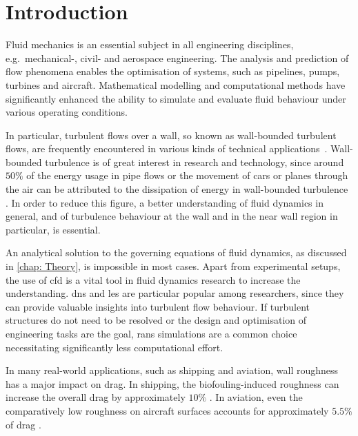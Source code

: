 \chapter{Introduction}\label{chap: Introduction}

Fluid mechanics is an essential subject in all engineering disciplines, e.g.\ mechanical-, civil- and aerospace engineering.
The analysis and prediction of flow phenomena enables the optimisation of systems, such as pipelines, pumps, turbines and aircraft.
Mathematical modelling and computational methods have significantly enhanced the ability to simulate and evaluate fluid behaviour under various operating conditions.

In particular, turbulent flows over a wall, so known as wall-bounded turbulent flows, are frequently encountered in various kinds of technical applications~\citep{marusicWallboundedTurbulentFlows2010,schlichtingBoundaryLayerTheory2017}.
Wall-bounded turbulence is of great interest in research and technology, since around $50 \%$ of the energy usage in pipe flows or the movement of cars or planes through the air can be attributed to the dissipation of energy in wall-bounded turbulence \citep{jimenezCascadesWallBoundedTurbulence2012}.
In order to reduce this figure, a better understanding of fluid dynamics in general, and of turbulence behaviour at the wall and in the near wall region in particular, is essential.

An analytical solution to the governing equations of fluid dynamics, as discussed in \autoref{chap: Theory}, is impossible in most cases.
Apart from experimental setups, the use of \acrfull{cfd} is a vital tool in fluid dynamics research to increase the understanding.
\acrfull{dns} and \acrfull{les} are particular popular among researchers, since they can provide valuable insights into turbulent flow behaviour\citep{moinDIRECTNUMERICALSIMULATION1998}.
If turbulent structures do not need to be resolved or the design and optimisation of engineering tasks are the goal, \acrfull{rans} simulations are a common choice necessitating significantly less computational effort.

In many real-world applications, such as shipping and aviation, wall roughness has a major impact on drag.
In shipping, the biofouling-induced roughness can increase the overall drag by approximately $10 \%$ \citep{flackReviewHydraulicRoughness2010}. 
In aviation, even the comparatively low roughness on aircraft surfaces accounts for approximately $5.5 \%$ of drag \citep{chungPredictingDragRough2021}. 

